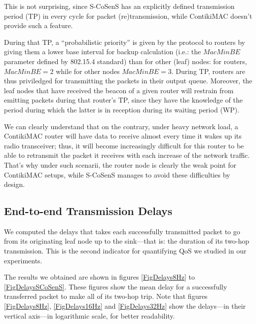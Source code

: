 \documentclass[12pt,a4paper]{article}
\begin{document}
This is not surprising, since S-CoSenS has an explicitly defined transmission
period (TP) in every cycle for packet (re)transmission, while ContikiMAC
doesn't provide such a feature.

During that TP, a ``probabilistic priority'' is given by the protocol to
routers by giving them a lower base interval for backup calculation
(i.e.: the $MacMinBE$ parameter defined by 802.15.4 standard) than
for other (leaf) nodes: for routers, $MacMinBE = 2$ while for
other nodes $MacMinBE = 3$. During TP, routers are thus priviledged
for transmitting the packets in their output queue. Moreover,
the leaf nodes that have received the beacon of a given router
will restrain from emitting packets during that router's TP,
since they have the knowledge of the period during which
the latter is in reception during its waiting period (WP).

We can clearly understand that on the contrary, under heavy network load,
a ContikiMAC router will have data to receive almost every time it wakes up
its radio transceiver; thus, it will become increasingly difficult for this
router to be able to retransmit the packet it receives with each increase
of the network traffic. That's why under such scenarii, the router node
is clearly the weak point for ContikiMAC setups, while S-CoSenS manages
to avoid these difficulties by design.



\subsection{End-to-end Transmission Delays}

We computed the delays that takes each successfully transmitted packet to go
from its originating leaf node up to the sink---that is: the duration of its
two-hop transmission. This is the second indicator for quantifying QoS
we studied in our experiments.

The results we obtained are shown in figures \ref{FigDelays8Hz} to
\ref{FigDelaysSCoSenS}. These figures show the mean delay for
a successfully transferred packet to make all of its two-hop trip.
Note that figures \ref{FigDelays8Hz}, \ref{FigDelays16Hz} and
\ref{FigDelays32Hz} show the delays---in their vertical axis---in
logarithmic scale, for better readability.
\end{document}
